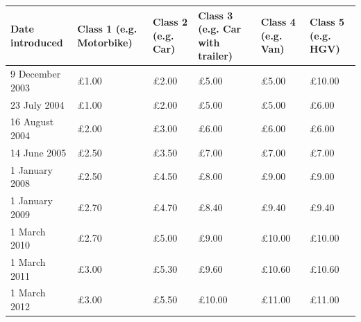 \documentclass{article}
\begin{document}
\begin{tabular}{llllll}
\toprule
Date introduced & Class 1 (e.g. Motorbike) & Class 2 (e.g. Car) & Class 3 (e.g. Car with trailer) & Class 4 (e.g. Van) & Class 5 (e.g. HGV) \\
\midrule
9 December 2003 & £1.00 & £2.00 & £5.00 & £5.00 & £10.00 \\
23 July 2004 & £1.00 & £2.00 & £5.00 & £5.00 & £6.00 \\
16 August 2004 & £2.00 & £3.00 & £6.00 & £6.00 & £6.00 \\
14 June 2005 & £2.50 & £3.50 & £7.00 & £7.00 & £7.00 \\
1 January 2008 & £2.50 & £4.50 & £8.00 & £9.00 & £9.00 \\
1 January 2009 & £2.70 & £4.70 & £8.40 & £9.40 & £9.40 \\
1 March 2010 & £2.70 & £5.00 & £9.00 & £10.00 & £10.00 \\
1 March 2011 & £3.00 & £5.30 & £9.60 & £10.60 & £10.60 \\
1 March 2012 & £3.00 & £5.50 & £10.00 & £11.00 & £11.00 \\
\bottomrule
\end{tabular}
\end{document}
